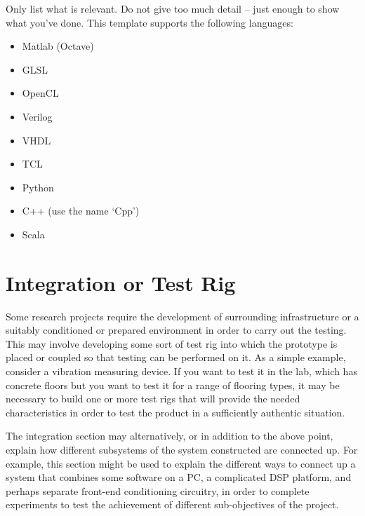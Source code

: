 \begin{minipage}[t]{\textwidth} %
  Only list what is relevant.  Do not give too much detail -- just enough to show what you've done.  This template supports the following languages:

  \vspace{-2ex} %
  \begin{itemize}\setlength{\itemsep}{-1ex} %
    \item Matlab (Octave)
    \item GLSL
    \item OpenCL
    \item Verilog
    \item VHDL
    \item TCL
    \item Python
    \item C++ (use the name `Cpp')
    \item Scala
  \end{itemize}
\end{minipage}

\section{Integration or Test Rig}

Some research projects require the development of surrounding infrastructure or a suitably conditioned or prepared environment in order to carry out the testing. This may involve developing some sort of test rig into which the prototype is placed or coupled so that testing can be performed on it.  As a simple example, consider a vibration measuring device. If you want to test it in the lab, which has concrete floors but you want to test it for a range of flooring types, it may be necessary to build one or more test rigs that will provide the needed characteristics in order to test the product in a sufficiently authentic situation.

The integration section may alternatively, or in addition to the above point, explain how different subsystems of the system constructed are connected up.  For example, this section might be used to explain the different ways to connect up a system that combines some software on a PC, a complicated DSP platform, and perhaps separate front-end conditioning circuitry, in order to complete experiments to test the achievement of different sub-objectives of the project.
